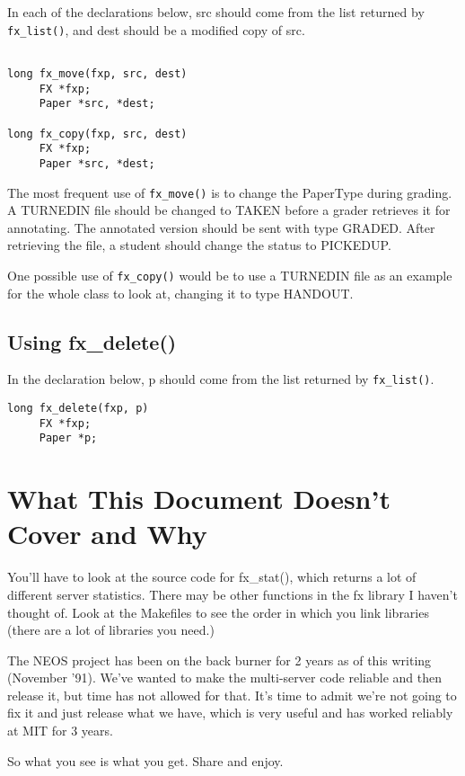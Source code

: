 In each of the declarations below, src should come from the list
returned by \verb+fx_list()+, and dest should be a modified copy of
src.

\begin{verbatim}

long fx_move(fxp, src, dest)
     FX *fxp;
     Paper *src, *dest;

long fx_copy(fxp, src, dest)
     FX *fxp;
     Paper *src, *dest;

\end{verbatim}

The most frequent use of \verb+fx_move()+ is to change the PaperType
during grading.  A TURNEDIN file should be changed to TAKEN before a
grader retrieves it for annotating.  The annotated version should be
sent with type GRADED.  After retrieving the file, a student should
change the status to PICKEDUP.

One possible use of \verb+fx_copy()+ would be to use a TURNEDIN file
as an example for the whole class to look at, changing it to type
HANDOUT.

\subsection{Using fx\_delete()}

In the declaration below, p should come from the list
returned by \verb+fx_list()+.

\begin{verbatim}
long fx_delete(fxp, p)
     FX *fxp;
     Paper *p;
\end{verbatim}



\section{What This Document Doesn't Cover and Why}

You'll have to look at the source code for fx_stat(), which returns a
lot of different server statistics.  There may be other functions in the
fx library I haven't thought of.  Look at the Makefiles to see the order
in which you link libraries (there are a lot of libraries you need.)

The NEOS project has been on the back burner for 2 years as of this
writing (November '91).  We've wanted to make the multi-server code
reliable and then release it, but time has not allowed for that.  It's
time to admit we're not going to fix it and just release what we have,
which is very useful and has worked reliably at MIT for 3 years.

So what you see is what you get.  Share and enjoy.
